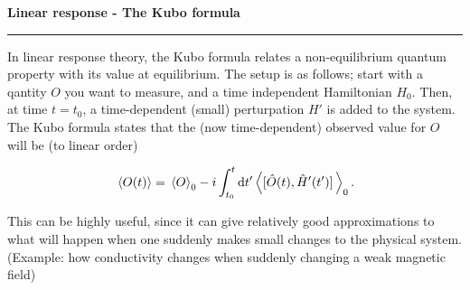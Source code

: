 
\begin{frame}
	\begin{block}{\color{white}\textbf{\Large{
		Linear response - The Kubo formula
			}}}
		\vspace{-10pt}\rule{\textwidth}{0.5pt}
		\color{white}
			In linear response theory, the Kubo formula relates a non-equilibrium quantum property with its value at equilibrium. 
			The setup is as follows; start with a qantity $O$ you want to measure, and a time independent Hamiltonian $H_0$.
			Then, at time $t = t_0$, a time-dependent (small) perturpation $H'$ is added to the system. 
			The Kubo formula states that the (now time-dependent) observed value for $O$ will be (to linear order)

	\end{block}
	{\large
		
		\begin{equation*} 
			\ev*{O(t)} = \ev*{O}_{0} - i \int_{t_0}^{t}\dd{t'}\ev{\comm*{\hat{O}(t)}{\hat{H}'(t')}}_{0}.
		\end{equation*}
	}

	\begin{block}{}
	\color{white}
	
		This can be highly useful, since it can give relatively good approximations to what will happen when one suddenly makes small changes to the physical system.
		(Example: how conductivity changes when suddenly changing a weak magnetic field)
		
	\end{block}
	

\end{frame}
